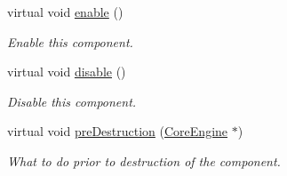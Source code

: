 \begin{Indent}
\begin{DoxyCompactItemize}
virtual void \mbox{\hyperlink{classrev_1_1_component_a94ce41128edb7a839f4dbaa764174cc0}{enable}} ()
\begin{DoxyCompactList}\small\item\em Enable this component. \end{DoxyCompactList}\item 
\mbox{\label{classrev_1_1_component_a53bddb242f02ae2c7cf1d4617ac98e44}} 
virtual void \mbox{\hyperlink{classrev_1_1_component_a53bddb242f02ae2c7cf1d4617ac98e44}{disable}} ()
\begin{DoxyCompactList}\small\item\em Disable this component. \end{DoxyCompactList}\item 
\mbox{\label{classrev_1_1_component_a7f4f15735b8eb474d6fc623749d0df78}} 
virtual void \mbox{\hyperlink{classrev_1_1_component_a7f4f15735b8eb474d6fc623749d0df78}{pre\+Destruction}} (\mbox{\hyperlink{classrev_1_1_core_engine}{Core\+Engine}} $\ast$)
\begin{DoxyCompactList}\small\item\em What to do prior to destruction of the component. \end{DoxyCompactList}\end{DoxyCompactItemize}
\end{Indent}
